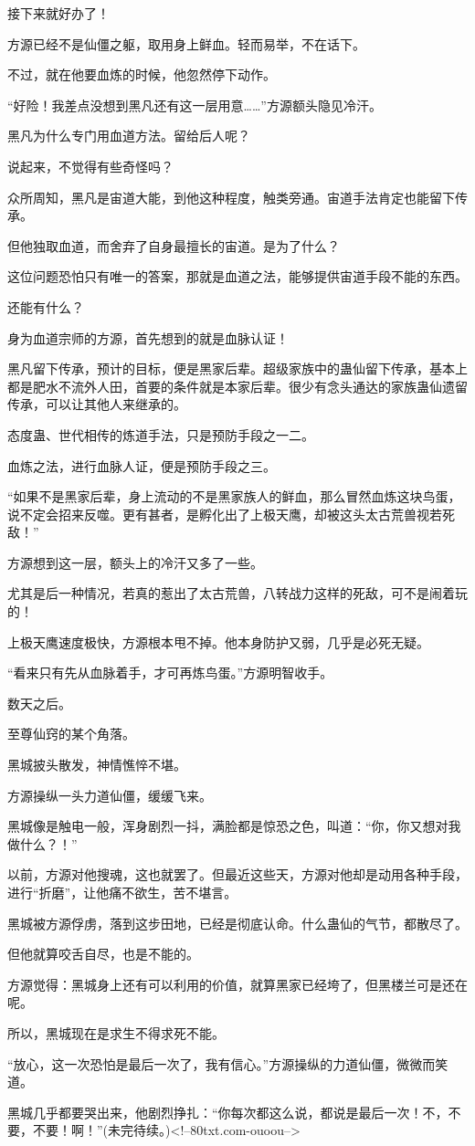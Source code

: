\begin{this_body}
接下来就好办了！

方源已经不是仙僵之躯，取用身上鲜血。轻而易举，不在话下。

不过，就在他要血炼的时候，他忽然停下动作。

“好险！我差点没想到黑凡还有这一层用意……”方源额头隐见冷汗。

黑凡为什么专门用血道方法。留给后人呢？

说起来，不觉得有些奇怪吗？

众所周知，黑凡是宙道大能，到他这种程度，触类旁通。宙道手法肯定也能留下传承。

但他独取血道，而舍弃了自身最擅长的宙道。是为了什么？

这位问题恐怕只有唯一的答案，那就是血道之法，能够提供宙道手段不能的东西。

还能有什么？

身为血道宗师的方源，首先想到的就是血脉认证！

黑凡留下传承，预计的目标，便是黑家后辈。超级家族中的蛊仙留下传承，基本上都是肥水不流外人田，首要的条件就是本家后辈。很少有念头通达的家族蛊仙遗留传承，可以让其他人来继承的。

态度蛊、世代相传的炼道手法，只是预防手段之一二。

血炼之法，进行血脉人证，便是预防手段之三。

“如果不是黑家后辈，身上流动的不是黑家族人的鲜血，那么冒然血炼这块鸟蛋，说不定会招来反噬。更有甚者，是孵化出了上极天鹰，却被这头太古荒兽视若死敌！”

方源想到这一层，额头上的冷汗又多了一些。

尤其是后一种情况，若真的惹出了太古荒兽，八转战力这样的死敌，可不是闹着玩的！

上极天鹰速度极快，方源根本甩不掉。他本身防护又弱，几乎是必死无疑。

“看来只有先从血脉着手，才可再炼鸟蛋。”方源明智收手。

数天之后。

至尊仙窍的某个角落。

黑城披头散发，神情憔悴不堪。

方源操纵一头力道仙僵，缓缓飞来。

黑城像是触电一般，浑身剧烈一抖，满脸都是惊恐之色，叫道：“你，你又想对我做什么？！”

以前，方源对他搜魂，这也就罢了。但最近这些天，方源对他却是动用各种手段，进行“折磨”，让他痛不欲生，苦不堪言。

黑城被方源俘虏，落到这步田地，已经是彻底认命。什么蛊仙的气节，都散尽了。

但他就算咬舌自尽，也是不能的。

方源觉得：黑城身上还有可以利用的价值，就算黑家已经垮了，但黑楼兰可是还在呢。

所以，黑城现在是求生不得求死不能。

“放心，这一次恐怕是最后一次了，我有信心。”方源操纵的力道仙僵，微微而笑道。

黑城几乎都要哭出来，他剧烈挣扎：“你每次都这么说，都说是最后一次！不，不要，不要！啊！”(未完待续。)<!--80txt.com-ouoou-->

\end{this_body}

